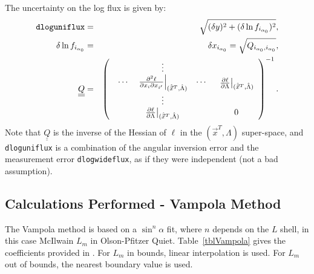 \documentclass{article}    %
\newcommand{\dbul}[1]{\underline{\underline{#1}}}
\begin{document}
The uncertainty on the log flux is given by:
\begin{eqnarray}
\verb|dloguniflux| &=& 
\sqrt{(\delta y)^2 + (\delta \ln f_{i_{\alpha_0}} )^2}, \\
\delta\ln f_{i_{\alpha_0}} &=& \delta x_{i_{\alpha_0}} =
\sqrt{Q_{i_{\alpha_0},i_{\alpha_0}}}, 
\\
\dbul{Q} &=& \left(
  \begin{array}{cc}
  \begin{array}{ccc}
    ~ & \vdots & ~ \\
    \cdots & \left.
      \frac{\partial^2 \ell}{\partial x_i \partial x_{i'}}\right|_{(\hat{\vec{x}}^T,\hat{\Lambda})}
    & \cdots \\
    ~ & \vdots & ~ 
  \end{array} & \left.\frac{\partial \ell}{\partial \Lambda}\right|_{(\hat{\vec{x}}^T,\hat{\Lambda})} \\
  \left.\frac{\partial \ell}{\partial \Lambda}\right|_{(\hat{\vec{x}}^T,\hat{\Lambda})} & 0
  \end{array}
\right)^{-1}.
\end{eqnarray}
Note that $\dbul{Q}$ is the inverse of the Hessian of $\ell$ in the
$(\vec{x}^T,\Lambda)$ super-space, and \verb|dloguniflux| is a
combination of the angular inversion error and the measurement error
\verb|dlogwideflux|, as if they were independent (not a bad
assumption).

\subsection{Calculations Performed - Vampola Method}

The Vampola method is based on a $\sin^n\alpha$ fit, where $n$ depends
on the $L$ shell, in this case McIlwain $L_m$ in Olson-Pfitzer
Quiet. Table~\ref{tblVampola} gives the coefficients provided in
\citet{Vampola1996}. For $L_m$ in bounds, linear interpolation
is used. For $L_m$ out of bounds, the nearest boundary value is used.
\end{document}
